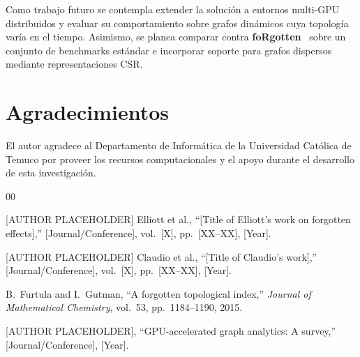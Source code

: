 \documentclass[conference]{IEEEtran}
\begin{document}
Como trabajo futuro se contempla extender la solución a entornos multi-GPU distribuidos y evaluar su comportamiento sobre grafos dinámicos cuya topología varía en el tiempo. Asimismo, se planea comparar contra \textbf{foRgotten}~\cite{elliott} sobre un conjunto de benchmarks estándar e incorporar soporte para grafos dispersos mediante representaciones CSR.

\section*{Agradecimientos}

El autor agradece al Departamento de Informática de la Universidad Católica de Temuco por proveer los recursos computacionales y el apoyo durante el desarrollo de esta investigación.

\begin{thebibliography}{00}

[AUTHOR PLACEHOLDER] Elliott et al., ``[Title of Elliott's work on forgotten effects],''
[Journal/Conference], vol.~[X], pp.~[XX--XX], [Year].

[AUTHOR PLACEHOLDER] Claudio et al., ``[Title of Claudio's work],''
[Journal/Conference], vol.~[X], pp.~[XX--XX], [Year].

B.~Furtula and I.~Gutman, ``A forgotten topological index,''
\textit{Journal of Mathematical Chemistry}, vol.~53, pp.~1184--1190, 2015.

[AUTHOR PLACEHOLDER], ``GPU-accelerated graph analytics: A survey,''
[Journal/Conference], [Year].

\end{thebibliography}
\end{document}
